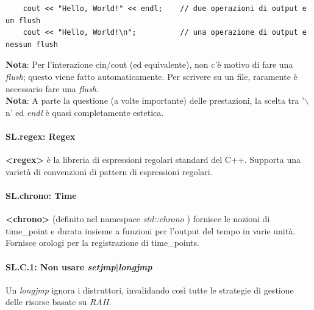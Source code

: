 \begin{lstlisting}
	cout << "Hello, World!" << endl;    // due operazioni di output e un flush
	cout << "Hello, World!\n";          // una operazione di output e nessun flush
\end{lstlisting}

\textsf{\small \textbf{Nota}: Per l'interazione cin/cout (ed equivalente), non c'è motivo di fare una \emph{flush}; questo viene fatto automaticamente. Per scrivere su un file, raramente è necessario fare una \emph{flush}.} \\

\textsf{\small \textbf{Nota}: A parte la questione (a volte importante) delle prestazioni, la scelta tra '$\backslash$n' ed \emph{endl} è quasi completamente estetica.} \\


\paragraph{SL.regex: Regex}

\textsf{\small \textbf{<regex>} è la libreria di espressioni regolari standard del C++. Supporta una varietà di convenzioni di pattern di espressioni regolari.} \\


\paragraph{SL.chrono: Time}

\textsf{\small \textbf{<chrono>} (definito nel namespace \emph{std::chrono} ) fornisce le nozioni di time\_point e durata insieme a funzioni per l'output del tempo in varie unità. Fornisce orologi per la registrazione di time\_points.} \\


\paragraph{SL.C.1: Non usare \emph{setjmp}|\emph{longjmp}}

\textsf{\small Un \emph{longjmp} ignora i distruttori, invalidando così tutte le strategie di gestione delle risorse basate su \emph{RAII}.} \\

